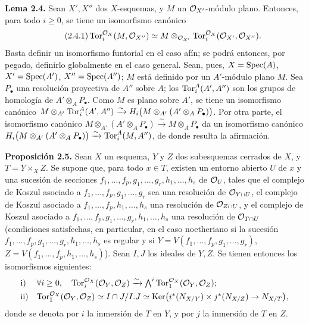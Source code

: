 \textbf{Lema 2.4.} Sean \(X',X''\) dos \(X\)-esquemas, y \(M\) un \(\mathcal O_{X'}\)-módulo plano. Entonces, para todo \(i\ge0\), se tiene un isomorfismo canónico
\begin{equation}\tag{2.4.1}
\operatorname{Tor}_i^{\mathcal O_X}(M,\mathcal O_{X''})\simeq
M\otimes_{\mathcal O_{X'}}\operatorname{Tor}_i^{\mathcal O_X}(\mathcal O_{X'},\mathcal O_{X''}).
\end{equation}
Basta definir un isomorfismo funtorial en el caso afín; se podrá entonces, por pegado, definirlo globalmente en el caso general. Sean, pues, \(X=\operatorname{Spec}(A)\), \(X'=\operatorname{Spec}(A')\), \(X''=\operatorname{Spec}(A'')\); \(M\) está definido por un \(A'\)-módulo plano \(M\). Sea \(P_\bullet\) una resolución proyectiva de \(A''\) sobre \(A\); los \(\operatorname{Tor}_i^A(A',A'')\) son los grupos de homología de \(A'\otimes_A P_\bullet\). Como \(M\) es plano sobre \(A'\), se tiene un isomorfismo canónico \(M\otimes_{A'}\operatorname{Tor}_i^A(A',A'')\xrightarrow{\sim}H_i\bigl(M\otimes_{A'}(A'\otimes_A P_\bullet)\bigr)\). Por otra parte, el isomorfismo canónico \(M\otimes_{A'}(A'\otimes_A P_\bullet)\xrightarrow{\sim}M\otimes_A P_\bullet\) da un isomorfismo canónico \(H_i\bigl(M\otimes_{A'}(A'\otimes_A P_\bullet)\bigr)\xrightarrow{\sim}\operatorname{Tor}_i^A(M,A'')\), de donde resulta la afirmación.

\textbf{Proposición 2.5.} Sean \(X\) un esquema, \(Y\) y \(Z\) dos subesquemas cerrados de \(X\), y \(T=Y\times_X Z\). Se supone que, para todo \(x\in T\), existen un entorno abierto \(U\) de \(x\) y una sucesión de secciones \(f_1,\ldots,f_p,g_1,\ldots,g_r,h_1,\ldots,h_s\) de \(\mathcal O_U\), tales que el complejo de Koszul asociado a \(f_1,\ldots,f_p,g_1,\ldots,g_r\) sea una resolución de \(\mathcal O_{Y\cap U}\), el complejo de Koszul asociado a \(f_1,\ldots,f_p,h_1,\ldots,h_s\) una resolución de \(\mathcal O_{Z\cap U}\), y el complejo de Koszul asociado a \(f_1,\ldots,f_p,g_1,\ldots,g_r,h_1,\ldots,h_s\) una resolución de \(\mathcal O_{T\cap U}\) (condiciones satisfechas, en particular, en el caso noetheriano si la sucesión \(f_1,\ldots,f_p,g_1,\ldots,g_r,h_1,\ldots,h_s\) es regular y si \(Y=V(f_1,\ldots,f_p,g_1,\ldots,g_r)\), \(Z=V(f_1,\ldots,f_p,h_1,\ldots,h_s)\)). Sean \(I,J\) los ideales de \(Y,Z\). Se tienen entonces los isomorfismos siguientes:
\[
\begin{array}{ll}
\text{i)}& \forall i\ge0,\quad
\Tor_i^{\cO_X}(\cO_Y,\cO_Z)\xrightarrow{\sim}
\bigwedge^i\Tor_1^{\cO_X}(\cO_Y,\cO_Z);\\[0.8ex]
\text{ii)}&
\Tor_1^{\cO_X}(\cO_Y,\cO_Z)\simeq
I\cap J/I.J\simeq
\Ker\bigl(i^*(\sisi{N_{Y/X}}{N_{X/Y}})\times j^*(\sisi{N_{Z/X}}{N_{X/Z}})\to \sisi{N_{T/X}}{N_{X/T}}\bigr), %
\end{array}
\]
donde se denota por \(i\) la inmersión de \(T\) en \(Y\), y por \(j\) la inmersión de \(T\) en \(Z\).

